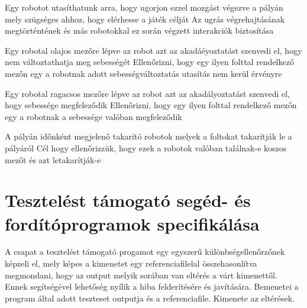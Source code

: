 %
{Egy robotot utasíthatunk arra, hogy ugorjon ezzel mozgást végezve a pályán mely szügséges ahhoz, hogy elérhesse a játék célját}%
{Az ugrás végrehajtásának megtörténtének és más robotokkal ez során végzett interakciók biztosítása}

%
{Egy robotal olajos mezőre lépve az robot azt az akadáéyoztatást szenvedi el, hogy nem változtathatja meg sebességét}%
{Ellenőrizni, hogy egy ilyen folttal rendelkező mezőn egy a robotnak adott sebességváltoztatás utasítás nem kerül érvényre}

%
{Egy robotal ragacsos mezőre lépve az robot azt az akadályoztatást szenvedi el, hogy sebessége megfeleződik}%
{Ellenőrizni, hogy egy ilyen folttal rendelkező mezőn egy a robotnak a sebessége valóban megfeleződik}

%
{A pályán időnként megjelenő takarító robotok melyek a foltokat takarítják le a pályáról}%
{Cél hogy ellenőrizzük, hogy ezek a robotok valóban találnak-e koszos mezőt és azt letakarítják-e}

\section{Tesztelést támogató segéd- és fordítóprogramok specifikálása}
A csapat a tesztelést támogató progamot egy egyszerű különbségellenőrzőnek képzeli el, mely képes a kimenetet egy referenciafilelal összehasonlítva megmondani,
hogy az output melyik sorában van eltérés a várt kimenettől. Ennek segítségével lehetőség nyílik a hiba felderítésére és javítására. Bemenetei a program által adott
teszteset outputja és a referenciafile. Kimenete az eltérések. 

